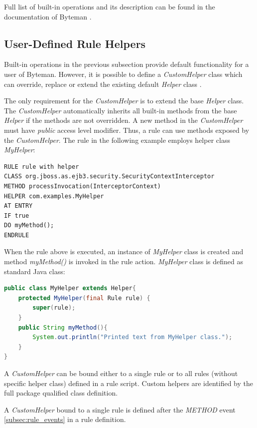 \documentclass[12pt,oneside]{fithesis2}
\begin{document}
Full list of built-in operations and its description can be found in the documentation of Byteman \cite{byteman_doc}.

\subsection{User-Defined Rule Helpers}
Built-in operations in the previous subsection provide default functionality for a user of Byteman. However, it is possible to define a \textit{CustomHelper} class which can override, replace or extend the existing default \textit{Helper} class \cite[User-Defined Rule Helpers]{byteman_doc}.

The only requirement for the \textit{CustomHelper} is to extend the base \textit{Helper} class. The \textit{CustomHelper} automatically inherits all built-in methods from the base \textit{Helper} if the methods are not overridden. A new method in the \textit{CustomHelper} must have \textit{public} access level modifier. Thus, a rule can use methods exposed by the \textit{CustomHelper}.
\newpage
The rule in the following example employs helper class \textit{MyHelper}:
\begin{lstlisting}[caption = Rule with user-defined helper class, label = rule_with_helper]
RULE rule with helper
CLASS org.jboss.as.ejb3.security.SecurityContextInterceptor
METHOD processInvocation(InterceptorContext)
HELPER com.examples.MyHelper
AT ENTRY
IF true
DO myMethod();
ENDRULE
\end{lstlisting}

When the rule above is executed, an instance of \textit{MyHelper} class is created and method \textit{myMethod()} is invoked in the rule action. \textit{MyHelper} class is defined as standard Java class:
\begin{lstlisting}[caption = User-Defined helper class, label = rule_helper, language=Java]
public class MyHelper extends Helper{
	protected MyHelper(final Rule rule) {
		super(rule);
	}
	public String myMethod(){
		System.out.println("Printed text from MyHelper class.");
	}
}
\end{lstlisting}

A \textit{CustomHelper} can be bound either to a single rule or to all rules (without specific helper class) defined in a rule script. Custom helpers are identified by the full package qualified class definition.

A \textit{CustomHelper} bound to a single rule is defined after the \textit{METHOD} event \ref{subsec:rule_events} in a rule definition.
	
\end{document}
